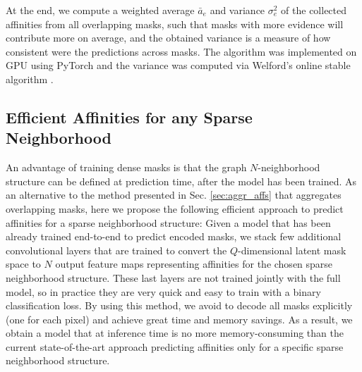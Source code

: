 At the end, we compute a weighted average $\bar{a}_e$ and variance $\sigma^2_e$ of the collected affinities from all overlapping masks, such that masks with more evidence will contribute more on average, and the obtained variance is a measure of how consistent were the predictions across masks. 
The algorithm was implemented on GPU using PyTorch \cite{NEURIPS2019_9015} and the variance was computed via Welford's online stable algorithm \cite{welford1962note}.


\subsection{Efficient Affinities for any Sparse Neighborhood}\label{sec:efficient_affs}
An advantage of training dense \maskname masks is that the graph $N$-neighborhood structure can be defined at prediction time, after the model has been trained. As an alternative to the method presented in Sec. \ref{sec:aggr_affs} that aggregates overlapping masks, here we propose the following efficient approach to predict affinities for a sparse neighborhood structure: Given a model that has been already trained end-to-end to predict encoded \maskname masks, we stack few additional convolutional layers that are trained to convert the $Q$-dimensional latent mask space to $N$ output feature maps representing affinities for the chosen sparse neighborhood structure. These last layers are not trained jointly with the full model, so in practice they are very quick and easy to train with a binary classification loss. By using this method, we avoid to decode all masks explicitly (one for each pixel) and achieve great time and memory savings.
As a result, we obtain a model that at inference time is no more memory-consuming than the current state-of-the-art approach predicting affinities only for a specific sparse neighborhood structure.




